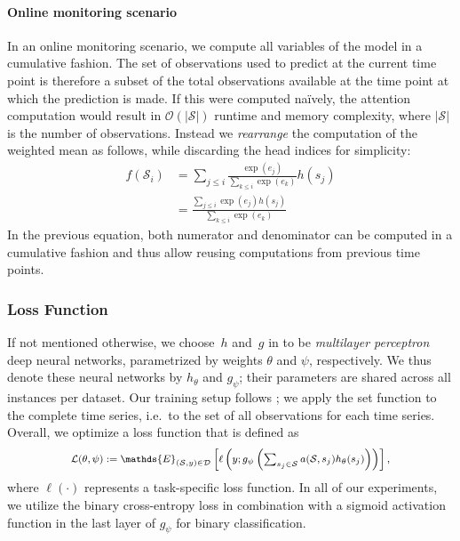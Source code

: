 \documentclass{article}
\newcommand{\E}        {\mathds{E}}
\newcommand{\attention}{a}
\begin{document}
\paragraph{Online monitoring scenario}
In an online monitoring scenario, we compute all variables of the model in
a cumulative fashion.  The set of observations used to predict at the current
time point is therefore a subset of the total observations available at the time
point at which the prediction is made.  If this were computed na\"ively, the
attention computation would result in $\mathcal{O}(|\mathcal{S}|)$ runtime and
memory complexity, where $|\mathcal{S}|$ is the number of observations.
Instead we \emph{rearrange} the computation of the weighted mean as
follows, while discarding the head indices for simplicity:
\begin{align*}
    f(\mathcal{S}_i) &= \sum_{j \leq i} \frac{\exp(e_j)}{\sum_{k \leq i} \exp(e_k)} h(s_j) \\
        &= \frac{\sum_{j \leq i} \exp(e_j) h(s_j) }{\sum_{k \leq i} \exp(e_k)}
\end{align*}
In the previous equation, both numerator and denominator can be computed
in a cumulative fashion and thus allow reusing computations from
previous time points.

\subsubsection{Loss Function}
If not mentioned otherwise, we choose~$h$ and~$g$ in
 to be \emph{multilayer perceptron}
deep neural networks, parametrized by weights $\theta$ and $\psi$,
respectively. We thus denote these neural networks by $h_\theta$ and
$g_\psi$; their parameters are shared across all instances per dataset. 
Our training setup follows \citet{zaheer2017deep}; we apply the set
function to the complete time series, i.e.\ to the set of all
observations for each time series.
Overall, we optimize a loss function that is defined as
\begin{equation*}
  \begin{medsize}
    \mathcal{L}(\theta, \psi) := \E_{(\mathcal{S}, y) \in \mathcal{D}} \left[
        \ell \left(
            y; g_\psi \left(
              \sum_{s_j \in \mathcal{S}} \attention(\mathcal{S}, s_j) h_\theta(s_j)
            \right)
        \right)
    \right],
  \end{medsize}
\end{equation*}
where $\ell(\cdot)$ represents a task-specific loss function. In all of our
experiments, we utilize the binary cross-entropy loss in combination with
a sigmoid activation function in the last layer of $g_\psi$ for binary
classification.
\end{document}

